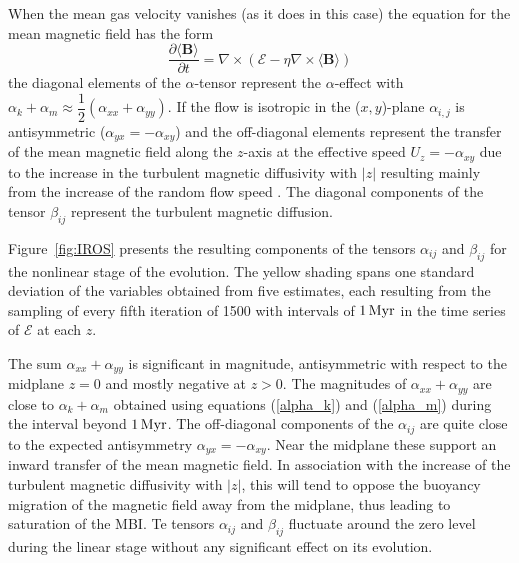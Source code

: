 \documentclass[fleqn,usenatbib]{mnras}
\newcommand\deriv[2]{\frac{\partial#1}{\partial#2}}%
\renewcommand\vec[1]{\bm{#1}}%
\newcommand{\Myr}{\,{\rm Myr}} %
\begin{document}
When the mean gas velocity vanishes (as it does in this case) the equation for
the mean magnetic field has the form
\begin{equation}
    \deriv{\langle \vec{B} \rangle }{t} = \nabla \times (\mathcal{E}-\eta\nabla\times\langle\vec{B}\rangle)
\end{equation}
the diagonal elements of the $\alpha$-tensor represent the $\alpha$-effect with
$\alpha_k+\alpha_m \approx \dfrac{1}{2}(\alpha_{xx}+\alpha_{yy})$. If the flow
is isotropic in the ($x,y$)-plane $\alpha_{i,j}$ is antisymmetric ($\alpha_{yx}
= -\alpha_{xy}$) and the off-diagonal elements represent the transfer of the
mean magnetic field along the $z$-axis at the effective speed $U_z =
-\alpha_{xy}$ due to the increase in the turbulent magnetic diffusivity with
$\lvert z \rvert$ resulting mainly from the increase of the random flow speed
\citep[turbulent diamagnetism -- e.g., Section~7.9 of][]{SS21}. The diagonal
components of the tensor $\beta_{ij}$ represent the turbulent magnetic
diffusion.

Figure~\ref{fig:IROS} presents the resulting components of the tensors
$\alpha_{ij}$ and $\beta_{ij}$ for the nonlinear stage of the evolution. The
yellow shading spans one standard deviation of the variables obtained from five
estimates, each resulting from the sampling of every fifth iteration of 1500
with intervals of $1\Myr$ in the time series of $\mathcal{E}$ at each $z$.

The sum $\alpha_{xx}+\alpha_{yy}$ is significant in magnitude, antisymmetric
with respect to the midplane $z=0$ and mostly negative at $z>0$.  The
magnitudes of $\alpha_{xx}+ \alpha_{yy}$ are close to $\alpha_{k}+\alpha_{m}$
obtained using equations (\ref{alpha_k}) and (\ref{alpha_m}) during the
interval beyond $1\Myr$. The off-diagonal components of the $\alpha_{ij}$ are
quite close to the expected antisymmetry $\alpha_{yx}=-\alpha_{xy}$.  Near the
midplane these support an inward transfer of the mean magnetic field.  In
association with the increase of the turbulent magnetic diffusivity with
$\lvert z \rvert$, this will tend to oppose the buoyancy migration of the
magnetic field away from the midplane, thus leading to saturation of the MBI.
Te tensors $\alpha_{ij}$ and $\beta_{ij}$ fluctuate around the zero level
during the linear stage without any significant effect on its evolution.
\end{document}

